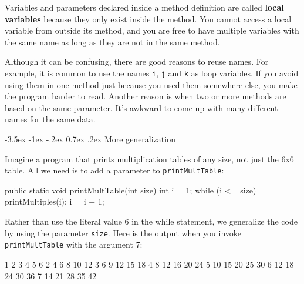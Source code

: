 \documentclass[12pt]{book}
\makeatletter
\renewcommand{\section}{\@startsection {section}{1}{\z@}%
    {-3.5ex \@plus -1ex \@minus -.2ex}%
    {0.7ex \@plus.2ex}%
    {\normalfont\Large\bfseries}}
\theoremstyle{exercise}
\makeatother
\begin{document}


Variables and parameters declared inside a method definition are called {\bf local variables} because they only exist inside the method.
You cannot access a local variable from outside its method, and you are free to have multiple variables with the same name as long as they are not in the same method.


Although it can be confusing, there are good reasons to reuse names.
For example, it is common to use the names {\tt i}, {\tt j} and {\tt k} as loop variables.
If you avoid using them in one method just because you used them somewhere else, you make the program harder to read.
Another reason is when two or more methods are based on the same parameter.
It's awkward to come up with many different names for the same data.

\section{More generalization}

Imagine a program that prints multiplication tables of any size, not just the 6x6 table.
All we need is to add a parameter to {\tt printMultTable}:

\begin{code}
    public static void printMultTable(int size) {
        int i = 1;
        while (i <= size) {
            printMultiples(i);
            i = i + 1;
        }
    }
\end{code}

Rather than use the literal value 6 in the while statement, we generalize the code by using the parameter {\tt size}.
Here is the output when you invoke {\tt printMultTable} with the argument 7:

\begin{stdout}
   1   2   3   4   5   6
   2   4   6   8  10  12
   3   6   9  12  15  18
   4   8  12  16  20  24
   5  10  15  20  25  30
   6  12  18  24  30  36
   7  14  21  28  35  42
\end{stdout}
\end{document}
